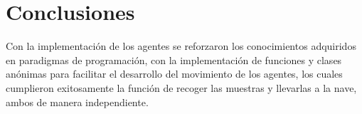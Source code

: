 \section{Conclusiones}
Con la implementación de los agentes se reforzaron los conocimientos adquiridos en paradigmas de programación, con la implementación de funciones y clases anónimas para facilitar el desarrollo del movimiento de los agentes, los cuales cumplieron exitosamente la función de recoger las muestras y llevarlas a la nave, ambos de manera independiente. 